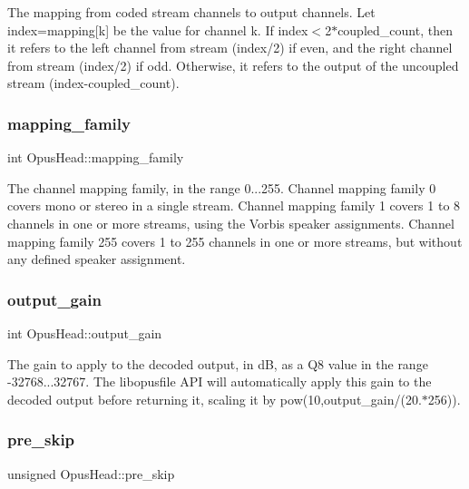 The mapping from coded stream channels to output channels. Let {\ttfamily index=mapping\mbox{[}k\mbox{]}} be the value for channel {\ttfamily k}. If {\ttfamily index$<$2$\ast$coupled\+\_\+count}, then it refers to the left channel from stream {\ttfamily (index/2)} if even, and the right channel from stream {\ttfamily (index/2)} if odd. Otherwise, it refers to the output of the uncoupled stream {\ttfamily (index-\/coupled\+\_\+count)}. \mbox{\label{struct_opus_head_a338268b4264e059ae9ede890e6177304}} 
\subsubsection{\texorpdfstring{mapping\+\_\+family}{mapping\_family}}
{\footnotesize\ttfamily int Opus\+Head\+::mapping\+\_\+family}

The channel mapping family, in the range 0...255. Channel mapping family 0 covers mono or stereo in a single stream. Channel mapping family 1 covers 1 to 8 channels in one or more streams, using the Vorbis speaker assignments. Channel mapping family 255 covers 1 to 255 channels in one or more streams, but without any defined speaker assignment. \mbox{\label{struct_opus_head_a1f1c9e144ab05fe281f088d3e73eeab2}} 
\subsubsection{\texorpdfstring{output\+\_\+gain}{output\_gain}}
{\footnotesize\ttfamily int Opus\+Head\+::output\+\_\+gain}

The gain to apply to the decoded output, in dB, as a Q8 value in the range -\/32768...32767. The {\ttfamily libopusfile} A\+PI will automatically apply this gain to the decoded output before returning it, scaling it by {\ttfamily pow(10,output\+\_\+gain/(20.$\ast$256))}. \mbox{\label{struct_opus_head_ab448d3d3289d99f01dca8f19e878d57f}} 
\subsubsection{\texorpdfstring{pre\+\_\+skip}{pre\_skip}}
{\footnotesize\ttfamily unsigned Opus\+Head\+::pre\+\_\+skip}

